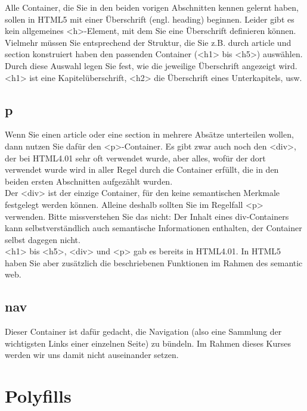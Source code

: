 Alle Container, die Sie in den beiden vorigen Abschnitten kennen gelernt haben, sollen in HTML5 mit einer Überschrift (engl. heading) beginnen. Leider gibt es kein allgemeines <h>-Element, mit dem Sie eine Überschrift definieren können.\\

Vielmehr müssen Sie entsprechend der Struktur, die Sie z.B. durch article und section konstruiert haben den passenden Container (<h1> bis <h5>) auswählen. Durch diese Auswahl legen Sie fest, wie die jeweilige Überschrift angezeigt wird. <h1> ist eine Kapitelüberschrift, <h2> die Überschrift eines Unterkapitels, usw.

\subsection{p}

Wenn Sie einen article oder eine section in mehrere Absätze unterteilen wollen, dann nutzen Sie dafür den <p>-Container. Es gibt zwar auch noch den <div>, der bei HTML4.01 sehr oft verwendet wurde, aber alles, wofür der dort verwendet wurde wird in aller Regel durch die Container erfüllt, die in den beiden ersten Abschnitten aufgezählt wurden.\\

Der <div> ist der einzige Container, für den keine semantischen Merkmale festgelegt werden können. Alleine deshalb sollten Sie im Regelfall <p> verwenden. Bitte missverstehen Sie das nicht: Der Inhalt eines div-Containers kann selbstverständlich auch semantische Informationen enthalten, der Container selbst dagegen nicht.\\

<h1> bis <h5>, <div> und <p> gab es bereits in HTML4.01. In HTML5 haben Sie aber zusätzlich die beschriebenen Funktionen im Rahmen des semantic web.

\subsection{nav}

Dieser Container ist dafür gedacht, die Navigation (also eine Sammlung der wichtigsten Links einer einzelnen Seite) zu bündeln. Im Rahmen dieses Kurses werden wir uns damit nicht auseinander setzen.

\section{Polyfills}

